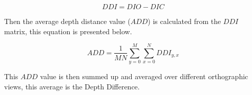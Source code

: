 $$
DDI = DIO - DIC
$$

Then the average depth distance value ($ADD$) is calculated from the $DDI$ matrix, this equation is presented below.

$$
ADD = \frac{1}{MN} \sum_{y=0}^{M} \sum_{x=0}^{N} DDI_{y,x}
$$

This $ADD$ value is then summed up and averaged over different orthographic views, this average is the Depth Difference.


